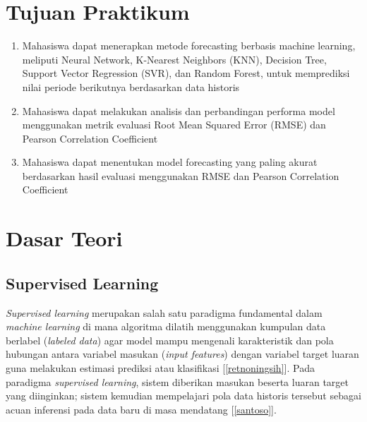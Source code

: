 \documentclass[a4paper,oneside,11pt]{book}
\begin{document}
\chapter{Tujuan Praktikum}
\begin{enumerate}
    \item Mahasiswa dapat menerapkan metode forecasting berbasis machine learning, meliputi Neural Network, K-Nearest Neighbors (KNN), Decision Tree, Support Vector Regression (SVR), dan Random Forest, untuk memprediksi nilai periode berikutnya berdasarkan data historis
    \item Mahasiswa dapat melakukan analisis dan perbandingan performa model menggunakan metrik evaluasi Root Mean Squared Error (RMSE) dan Pearson Correlation Coefficient
    \item Mahasiswa dapat menentukan model forecasting yang paling akurat berdasarkan hasil evaluasi menggunakan RMSE dan Pearson Correlation Coefficient
\end{enumerate}

\chapter{Dasar Teori}

\section{Supervised Learning}
\textit{Supervised learning} merupakan salah satu paradigma fundamental dalam \textit{machine learning} di mana algoritma dilatih menggunakan kumpulan data berlabel (\textit{labeled data}) agar model mampu mengenali karakteristik dan pola hubungan antara variabel masukan (\textit{input features}) dengan variabel target luaran guna melakukan estimasi prediksi atau klasifikasi [\ref{retnoningsih}]. Pada paradigma \textit{supervised learning}, sistem diberikan masukan beserta luaran target yang diinginkan; sistem kemudian mempelajari pola data historis tersebut sebagai acuan inferensi pada data baru di masa mendatang [\ref{santoso}].
\end{document}
